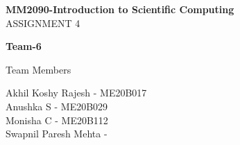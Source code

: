 \documentclass[a4paper,12pt]{article}
\begin{document}
\begin{titlepage}
    \begin{center}
        \vspace*{1cm}
        \Huge
        \textbf{MM2090-Introduction to Scientific Computing}\\
        \vspace{2cm}
        \LARGE
        ASSIGNMENT 4
        \vspace{1.5cm}
            
        \textbf{Team-6}
            
        \vfill
            
        Team Members
            
        \vspace{0.8cm}
            
        \Large
        Akhil Koshy Rajesh - ME20B017\\
        Anushka S - ME20B029\\
        Monisha C - ME20B112\\
        Swapnil Paresh Mehta - 
            
    \end{center}
\end{titlepage}

\tableofcontents
\newpage

\newpage

\newpage

\newpage

\newpage



\end{document}
